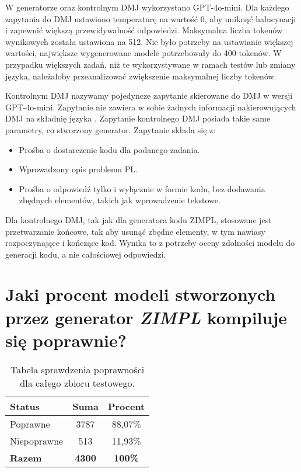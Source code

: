 
W generatorze oraz kontrolnym DMJ wykorzystano GPT-4o-mini. Dla każdego zapytania do DMJ ustawiono temperaturę na wartość 0, aby uniknąć halucynacji i zapewnić większą przewidywalność odpowiedzi. Maksymalna liczba tokenów wynikowych została ustawiona na 512. Nie było potrzeby na ustawianie większej wartości, największe wygenerowane modele potrzebowały do 400 tokenów. W przypadku większych zadań, niż te wykorzystywane w ramach testów lub zmiany języka, należałoby przeanalizować zwiększenie maksymalnej liczby tokenów.


Kontrolnym DMJ nazywamy pojedyncze zapytanie skierowane do DMJ w wersji GPT-4o-mini. Zapytanie nie zawiera w sobie żadnych informacji nakierowujących DMJ na składnię języka . Zapytanie kontrolnego DMJ posiada takie same parametry, co stworzony generator. Zapytanie składa się z:

\begin{itemize}
    \item Prośba o dostarczenie kodu  dla podanego zadania.
    \item Wprowadzony opis problemu PL.
    \item Prośba o odpowiedź tylko i wyłącznie w formie kodu, bez dodawania zbędnych elementów, takich jak wprowadzenie tekstowe.
\end{itemize}

Dla kontrolnego DMJ, tak jak dla generatora kodu ZIMPL, stosowane jest przetwarzanie końcowe, tak aby usunąć zbędne elementy, w tym nawiasy rozpoczynające i kończące kod. Wynika to z potrzeby oceny zdolności modelu do generacji kodu, a nie całościowej odpowiedzi.

\section{Jaki procent modeli stworzonych przez generator  \textit{ZIMPL} kompiluje się poprawnie?}

\begin{table}[H]
\caption{Tabela sprawdzenia poprawności dla całego zbioru testowego.}\label{tab:experiment:compilation}
\centering%
\begin{tabular}{|l|c|c|}
\hline
\textbf{Status} & \textbf{Suma} & \textbf{Procent} \\
\hline
Poprawne & 3787 & 88,07\% \\
\hline
Niepoprawne & 513 & 11,93\% \\
\hline
\textbf{Razem} & \textbf{4300} & \textbf{100\%} \\
\hline
\end{tabular}
\end{table}

